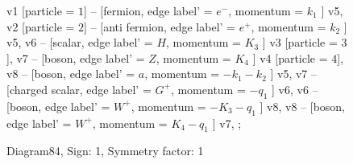 \documentclass{revtex4}
\begin{document}
\begin{figure}[!htb]
\begin{center}
{    %
v1 [particle = \(1\)] -- [fermion, edge label' = \(e^{-}\), momentum = \(k_{1}\) ] v5, 
v2 [particle = \(2\)] -- [anti fermion, edge label' = \(e^{+}\), momentum = \(k_{2}\) ] v5, 
v6 -- [scalar, edge label' = \(H\), momentum = \(K_{3}\) ] v3 [particle = \(3\)], 
v7 -- [boson, edge label' = \(Z\), momentum = \(K_{4}\) ] v4 [particle = \(4\)], 
v8 -- [boson, edge label' = \(a\), momentum = \(-k_{1} - k_{2}\) ] v5, 
v7 -- [charged scalar, edge label' = \(G^{+}\), momentum = \(-q_{1}\) ] v6, 
v6 -- [boson, edge label' = \(W^{+}\), momentum = \(-K_{3} - q_{1}\) ] v8, 
v8 -- [boson, edge label' = \(W^{+}\), momentum = \(K_{4} - q_{1}\) ] v7, 
};
\end{center}
\caption{Diagram84, Sign: 1, Symmetry factor: 1}
\end{figure}
\newpage
\end{document}
